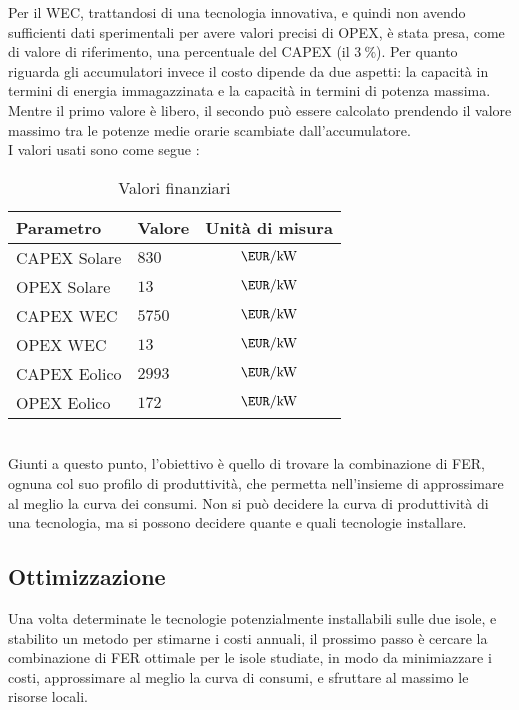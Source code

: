 \documentclass[fleqn,11pt]{SelfArx} %
\begin{document}
Per il WEC, trattandosi di una tecnologia innovativa, e quindi non avendo sufficienti dati sperimentali per avere valori precisi di OPEX, è stata presa, come di valore di riferimento, una percentuale del CAPEX (il \(\SI{3}{\percent}\)).
Per quanto riguarda gli accumulatori invece il costo dipende da due aspetti: la capacità in termini di energia immagazzinata e la capacità in termini di potenza massima. Mentre il primo valore è libero, il secondo può essere calcolato prendendo il valore massimo tra le potenze medie orarie scambiate dall'accumulatore. \\
I valori usati sono come segue\cite{IRENA:RenewPowerGen} \cite{OEE:2030Ocean} \cite{OCT:DevelopmentReport}: \\
\begingroup
\renewcommand{\arraystretch}{1.25}
\begin{table}[H]
	\caption{Valori finanziari}
	\centering
	\begin{tabular}{llc}
		\toprule
		Parametro    & Valore & Unità di misura      \\
		\midrule
		CAPEX Solare & $830$  & $\SI{}{\EUR\per\kW}$ \\
		OPEX Solare  & $13$   & $\SI{}{\EUR\per\kW}$ \\
		CAPEX WEC    & $5750$ & $\SI{}{\EUR\per\kW}$ \\
		OPEX WEC     & $13$   & $\SI{}{\EUR\per\kW}$ \\
		CAPEX Eolico & $2993$ & $\SI{}{\EUR\per\kW}$ \\
		OPEX Eolico  & $172$  & $\SI{}{\EUR\per\kW}$ \\
		\bottomrule
	\end{tabular}
	\label{tab:finparameters}
\end{table}
\endgroup \phantom{a} \\
Giunti a questo punto, l'obiettivo è quello di trovare la combinazione di FER, ognuna col suo profilo di produttività, che permetta nell'insieme di approssimare al meglio la curva dei consumi.
Non si può decidere la curva di produttività di una tecnologia, ma si possono decidere quante e quali tecnologie installare.

\subsection{Ottimizzazione}
Una volta determinate le tecnologie potenzialmente installabili sulle due isole, e stabilito un metodo per stimarne i costi annuali, il prossimo passo è cercare la combinazione di FER ottimale per le isole studiate, in modo da minimiazzare i costi, approssimare al meglio la curva di consumi, e sfruttare al massimo le risorse locali.
\end{document}
